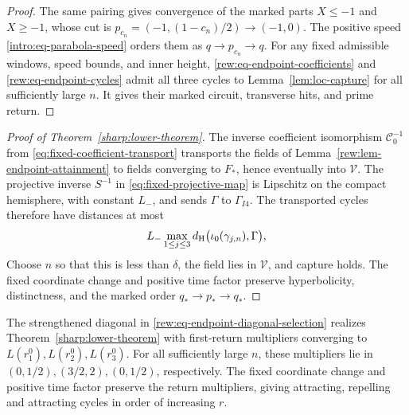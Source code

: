 \begin{proof}
The same pairing gives convergence of the marked parts \(X\le-1\)
and \(X\ge-1\), whose cut is \(p_{c_n}=(-1,(1-c_n)/2)\to(-1,0)\).
The positive speed \eqref{intro:eq-parabola-speed} orders them as
\(q\to p_{c_n}\to q\). For any fixed admissible windows, speed bounds,
and inner height, \eqref{rew:eq-endpoint-coefficients} and
\eqref{rew:eq-endpoint-cycles} admit all three cycles to
Lemma~\ref{lem:loc-capture} for all sufficiently large \(n\).
It gives their marked circuit, transverse hits, and prime return.
\end{proof}

\begin{proof}[Proof of Theorem~\ref{sharp:lower-theorem}]
The inverse coefficient isomorphism \(\mathscr C_0^{-1}\) from
\eqref{eq:fixed-coefficient-transport} transports the fields of
Lemma~\ref{rew:lem-endpoint-attainment} to fields converging to \(F_*\),
hence eventually into \(\mathcal V\). The projective inverse \(S^{-1}\) in
\eqref{eq:fixed-projective-map} is Lipschitz on the compact hemisphere,
with constant \(L_-\), and sends \(\Gamma\) to \(\Gamma_{I4}\).
The transported cycles therefore have distances at most
\[
 L_-\max_{1\le j\le3}
 d_{\rm H}\bigl(\iota_0(\gamma_{j,n}),\Gamma\bigr),
\]
Choose \(n\) so that this is less than \(\delta\), the field lies in
\(\mathcal V\), and capture holds. The fixed coordinate change and
positive time factor preserve hyperbolicity, distinctness, and the
marked order \(q_*\to p_*\to q_*\).
\end{proof}

The strengthened diagonal in
\eqref{rew:eq-endpoint-diagonal-selection} realizes
Theorem~\ref{sharp:lower-theorem} with first-return multipliers converging
to \(L(r_1^0),L(r_2^0),L(r_3^0)\). For all sufficiently large \(n\),
these multipliers lie in \((0,1/2),(3/2,2),(0,1/2)\), respectively.
The fixed coordinate change and positive time factor preserve the
return multipliers, giving attracting, repelling and attracting cycles
in order of increasing \(r\).
